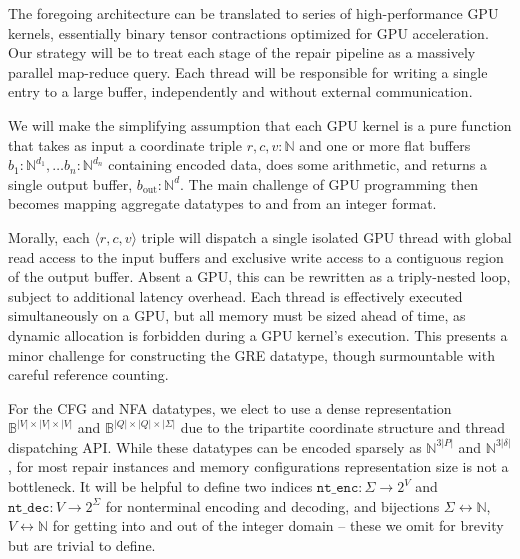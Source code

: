 \documentclass[sigplan,review,acmsmall,nonacm,screen,anonymous]{acmart}\settopmatter{printfolios=false,printccs=false,printacmref=false}
\begin{document}
The foregoing architecture can be translated to series of high-performance GPU kernels, essentially binary tensor contractions optimized for GPU acceleration. Our strategy will be to treat each stage of the repair pipeline as a massively parallel map-reduce query. Each thread will be responsible for writing a single entry to a large buffer, independently and without external communication.

We will make the simplifying assumption that each GPU kernel is a pure function that takes as input a coordinate triple $r, c, v: \mathbb{N}$ and one or more flat buffers $b_1: \mathbb{N}^{d_1}, \ldots b_n: \mathbb{N}^{d_n}$ containing encoded data, does some arithmetic, and returns a single output buffer, $b_{\text{out}}: \mathbb{N}^{d}$. The main challenge of GPU programming then becomes mapping aggregate datatypes to and from an integer format.

Morally, each $\langle r, c, v\rangle$ triple will dispatch a single isolated GPU thread with global read access to the input buffers and exclusive write access to a contiguous region of the output buffer. Absent a GPU, this can be rewritten as a triply-nested loop, subject to additional latency overhead. Each thread is effectively executed simultaneously on a GPU, but all memory must be sized ahead of time, as dynamic allocation is forbidden during a GPU kernel's execution. This presents a minor challenge for constructing the GRE datatype, though surmountable with careful reference counting.

For the CFG and NFA datatypes, we elect to use a dense representation $\mathbb{B}^{|V|\times|V|\times|V|}$ and $\mathbb{B}^{|Q|\times|Q|\times |\Sigma|}$ due to the tripartite coordinate structure and thread dispatching API. While these datatypes can be encoded sparsely as $\mathbb{N}^{3|P|}$ and $\mathbb{N}^{3|\delta|}$, for most repair instances and memory configurations representation size is not a bottleneck. It will be helpful to define two indices $\texttt{nt\_enc}: \Sigma \rightarrow 2^V$ and $\texttt{nt\_dec}: V \rightarrow 2^\Sigma$ for nonterminal encoding and decoding, and bijections $\Sigma \leftrightarrow \mathbb{N}$, $V \leftrightarrow \mathbb{N}$ for getting into and out of the integer domain -- these we omit for brevity but are trivial to define.
\end{document}
